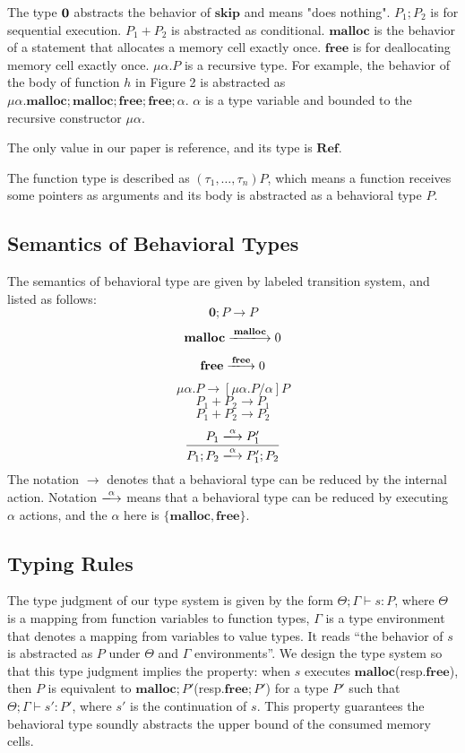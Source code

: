 \documentclass[english]{jssst_ppl} %
\newcommand\SKIP{\mathbf{skip}}
\newcommand\Malloc{\mathbf{malloc}}
\newcommand\Free{\mathbf{free}}
\theoremstyle{definition}
\begin{document}
The type $\bf 0$ abstracts the behavior of $\SKIP$ and means "does nothing". $P_{1};P_{2}$ is for sequential execution. $P_{1} + P_{2}$ is abstracted as conditional. $\Malloc$ is the behavior of a statement that allocates a memory cell exactly once. $\Free$ is for deallocating memory cell exactly once. $\mu \alpha. P$ is a recursive type. For example, the behavior of  the body of function $h$ in Figure 2 is abstracted as $\mu \alpha. \Malloc;\Malloc;\Free;\Free;\alpha$. $\alpha$ is a type variable and bounded to the recursive constructor $\mu \alpha$.

The only value in our paper is reference, and its type is $\mathbf{Ref}$.

The function type is described as $(\tau_{1}, \dots, \tau_{n})P$, which means a function receives some pointers as arguments and its body is abstracted as a behavioral type $P$.

\subsection{Semantics of Behavioral Types}
The semantics of behavioral type are given by labeled transition system, and listed as follows:
    $$
        \mathbf{0};P \rightarrow P
    $$
    $$
          \Malloc \xlongrightarrow{\Malloc} 0
    $$
    $$
           \Free \xlongrightarrow{\Free} 0
    $$
    $$
          \mu \alpha.P \rightarrow  [\mu \alpha . P/\alpha]  P
    $$
   $$
          P_{1} + P_{2} \longrightarrow P_{1}
   $$
   $$
          P_{1} + P_{2} \longrightarrow P_{2}
   $$
   $$
           \frac{P_{1} \xlongrightarrow{\alpha} P_{1}' }
                 {P_{1};P_{2} \xlongrightarrow{\alpha} P_{1}';P_{2}}
   $$
The notation $\rightarrow$ denotes that a behavioral type can be reduced by the internal action. Notation $\xlongrightarrow{\alpha}$ means that a behavioral type can be reduced by executing $\alpha$ actions, and the $\alpha$ here is $\{\Malloc, \Free\}$.

\subsection{Typing Rules}
The type judgment of our type system is given by the form $\Theta ; \Gamma \vdash s : P$, where $\Theta$ is a mapping from function variables to function types, $\Gamma$ is a type environment that denotes a mapping from variables to value types.
It reads ``the behavior of $s$ is abstracted as $P$ under $\Theta$ and $\Gamma$ environments''. We design the type system so that this type judgment implies the property: when $s$ executes $\Malloc$(resp.$\Free$), then $P$ is equivalent to $\Malloc;P'$(resp.$\Free;P'$) for a type $P'$ such that $\Theta; \Gamma \vdash s': P'$, where $s'$ is the continuation of $s$. This property guarantees the behavioral type soundly abstracts the upper bound of the consumed memory cells.
\end{document}
